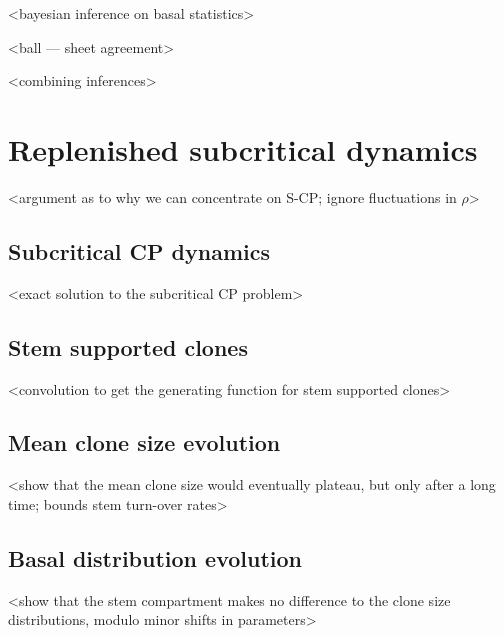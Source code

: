 \documentclass[10pt,UKenglish]{article}
\begin{document}
<bayesian inference on basal statistics>

<ball --- sheet agreement>

<combining inferences>

\section{Replenished subcritical dynamics}

<argument as to why we can concentrate on S-CP; ignore fluctuations in $\rho$>

\subsection{Subcritical CP dynamics}

<exact solution to the subcritical CP problem>

\subsection{Stem supported clones}

<convolution to get the generating function for stem supported clones>

\subsection{Mean clone size evolution}

<show that the mean clone size would eventually plateau, but only after a long time; bounds stem turn-over rates>

\subsection{Basal distribution evolution}

<show that the stem compartment makes no difference to the clone size distributions, modulo minor shifts in parameters>
\end{document}
